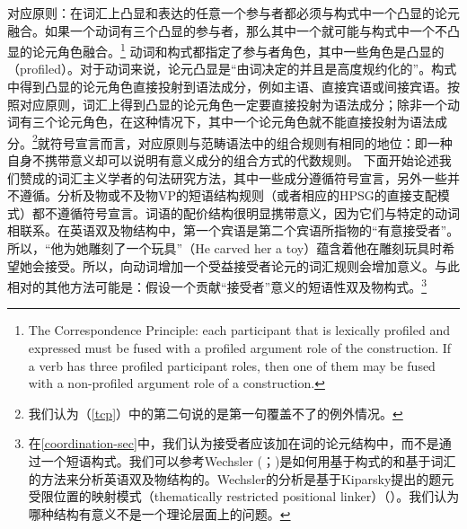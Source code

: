 \ea
对应原则：在词汇上凸显和表达的任意一个参与者都必须与构式中一个凸显的论元融合。如果一个动词有三个凸显的参与者，那么其中一个就可能与构式中一个不凸显的论元角色融合。\citep[]{Goldberg95a}\footnote{%
The Correspondence Principle:  each participant that is lexically profiled and expressed must be
fused with a profiled argument role of the construction.  If a verb has three profiled participant
roles, then one of them may be fused with a non-profiled argument role of a construction. 
}\label{tcp}
\z
动词和构式都指定了参与者角色，其中一些角色是凸显的（profiled）。对于动词来说，论元凸显是“由词决定的并且是高度规约化的”\citep[]{Goldberg95a}。构式中得到凸显的论元角色直接投射到语法成分，例如主语、直接宾语或间接宾语。按照对应原则，词汇上得到凸显的论元角色一定要直接投射为语法成分；除非一个动词有三个论元角色，在这种情况下，其中一个论元角色就不能直接投射为语法成分。\footnote{我们认为（\ref{tcp}）中的第二句说的是第一句覆盖不了的例外情况。}就符号宣言而言，对应原则与范畴语法中的组合规则有相同的地位：即一种自身不携带意义却可以说明有意义成分的组合方式的代数规则。
    下面开始论述我们赞成的词汇主义学者的句法研究方法，其中一些成分遵循符号宣言，另外一些并不遵循。分析及物或不及物VP的短语结构规则（或者相应的HPSG的直接支配模式）都不遵循符号宣言。词语的配价结构很明显携带意义，因为它们与特定的动词相联系。在英语双及物结构中，第一个宾语是第二个宾语所指物的“有意接受者”。所以，“他为她雕刻了一个玩具”（He carved her a toy）蕴含着他在雕刻玩具时希望她会接受。所以，向动词增加一个受益接受者论元的词汇规则会增加意义。与此相对的其他方法可能是：假设一个贡献“接受者”意义的短语性双及物构式。\footnote{%
在\ref{coordination-sec}中，我们认为接受者应该加在词的论元结构中，而不是通过一个短语构式。我们可以参考Wechsler (\citeyear[--113]{Wechsler91a-u}；\citeyear[--89]{Wechsler95a-u})是如何用基于构式的和基于词汇的方法来分析英语双及物结构的。Wechsler的分析是基于Kiparsky提出的题元受限位置的映射模式（thematically restricted positional linker）（\citeyear{Kiparsky87a-u, Kiparsky88a-u}）。我们认为哪种结构有意义不是一个理论层面上的问题。
}
